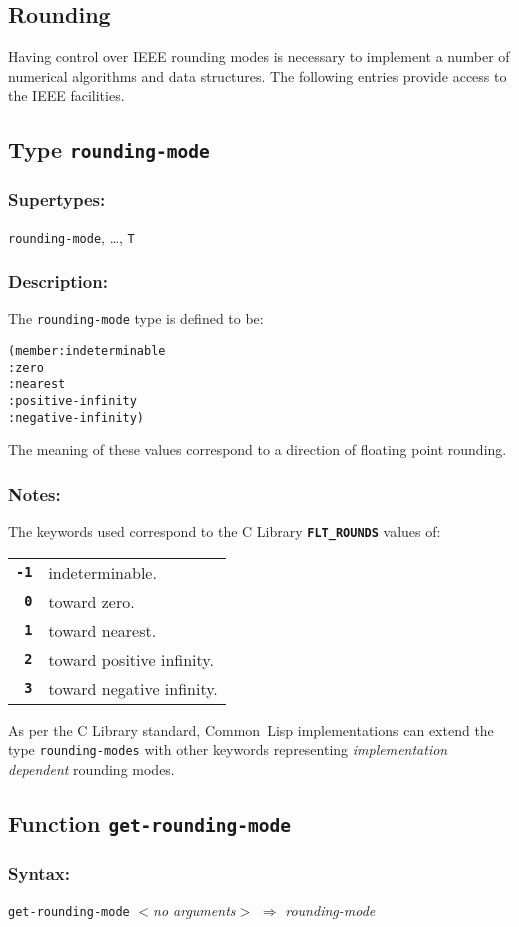 \documentclass[10pt,fleqn]{article}
\newcommand{\CL}{\textsf{Common~Lisp}}
\newcommand{\CLang}{\textsf{C}}
\newcommand{\code}[1]{\texttt{#1}}
\newcommand{\varname}[1]{\textit{#1}}
\newcommand{\DDictionaryItem}[1]{\vspace*{6pt}\noindent\hrulefill\vspace*{-9pt}\subsection*{#1}}
\newcommand{\DSyntax}{\subsubsection*{Syntax:}}
\newcommand{\DSupertypes}{\subsubsection*{Supertypes:}}
\newcommand{\DDescription}{\subsubsection*{Description:}}
\newcommand{\DNotes}{\subsubsection*{Notes:}}
\begin{document}
\subsection{Rounding}
\label{sect:rounding}

Having control over IEEE rounding modes is necessary to implement a
number of numerical algorithms and data structures. The following
entries provide access to the IEEE facilities.


\DDictionaryItem{Type \code{rounding-mode}}

\DSupertypes{}

\code{rounding-mode}, \ldots, \code{T}

\DDescription{}

The \code{rounding-mode} type is defined to be:
\begin{alltt}
(member :indeterminable
        :zero
        :nearest
        :positive-infinity
        :negative-infinity)
\end{alltt}
The meaning of these values correspond to a direction of floating
point rounding.


\DNotes{}

The keywords used correspond to the \CLang{} Library \cite{2018:C18}
\textbf{\code{FLT\_ROUNDS}} values of:

\vspace*{3mm}

\begin{tabular}{rl}
  \textbf{\code{-1}} & indeterminable.\\
  \textbf{\code{0}}  & toward zero.\\
  \textbf{\code{1}}  & toward nearest.\\
  \textbf{\code{2}}  & toward positive infinity.\\
  \textbf{\code{3}}  & toward negative infinity.\\
\end{tabular}

\vspace*{3mm}

As per the \CLang{} Library standard, \CL{} implementations can extend the
type \code{rounding-modes} with other keywords representing
\emph{implementation dependent} rounding modes.


\DDictionaryItem{Function \code{get-rounding-mode}}

\DSyntax{}

\code{get-rounding-mode} \textit{$<$no arguments$>$}
$\Rightarrow$ \varname{rounding-mode}
\end{document}
